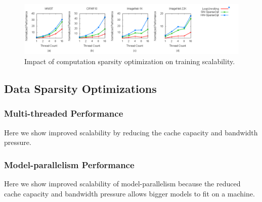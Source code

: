  \begin{figure}
 \centering
 \includegraphics[width=1.95\columnwidth]{Figures/compute_scaling.png}
\caption{Impact of computation sparsity optimization on training scalability.}
 \label{fig:compute_scaling}
 \end{figure}


\subsection{Data Sparsity Optimizations}
\label{subsec:data_sparsity_perf}

\subsubsection{Multi-threaded Performance}
\label{subsec:perf_multi_thread}

Here we show improved scalability by reducing the cache capacity and bandwidth pressure. 


\subsubsection{Model-parallelism Performance}
\label{subsec:perf_model_parallel}

Here we show improved scalability of model-parallelism because the reduced cache capacity and bandwidth pressure allows bigger models to fit on a machine. 
